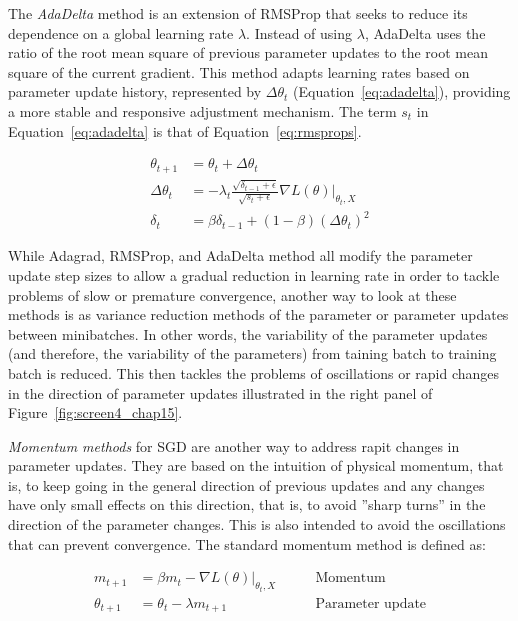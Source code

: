 The \emph{AdaDelta} method is an extension of RMSProp that seeks to reduce its dependence on a global learning rate $\lambda$. Instead of using $\lambda$, AdaDelta uses the ratio of the root mean square of previous parameter updates to the root mean square of the current gradient. This method adapts learning rates based on parameter update history, represented by $\Delta\theta_t$ (Equation~\ref{eq:adadelta}), providing a more stable and responsive adjustment mechanism. The term $s_t$ in Equation~\ref{eq:adadelta} is that of Equation~\ref{eq:rmsprops}.

\begin{align}
\theta_{t+1} &= \theta_t + \Delta\theta_t \nonumber \\
\Delta\theta_{t} &= - \lambda_t \frac{\sqrt{\delta_{t-1} + \epsilon}}{\sqrt{s_t + \epsilon}} \nabla L(\theta) \rvert_{\theta_t, X} \label{eq:adadelta} \\
\delta_t &= \beta \delta_{t-1} + (1-\beta) (\Delta\theta_t)^2 \nonumber
\end{align}

While Adagrad, RMSProp, and AdaDelta method all modify the parameter update step sizes to allow a gradual reduction in learning rate in order to tackle problems of slow or premature convergence, another way to look at these methods is as variance reduction methods of the parameter or parameter updates between minibatches. In other words, the variability of the parameter updates (and therefore, the variability of the parameters) from taining batch to training batch is reduced. This then tackles the problems of oscillations or rapid changes in the direction of parameter updates illustrated in the right panel of Figure~\ref{fig:screen4_chap15}.

\emph{Momentum methods} for SGD are another way to address rapit changes in parameter updates. They are based on the intuition of physical momentum, that is, to keep going in the general direction of previous updates and any changes have only small effects on this direction, that is, to avoid ''sharp turns'' in the direction of the parameter changes. This is also intended to avoid the oscillations that can prevent convergence. The standard momentum method is defined as:

\begin{align*}
m_{t+1} &= \beta m_{t} - \nabla L(\theta) \rvert_{\theta_t, X} &\qquad \text{Momentum} \\
\theta_{t+1} &= \theta_{t} - \lambda m_{t+1} &\qquad \text{Parameter update} \\
\end{align*}

